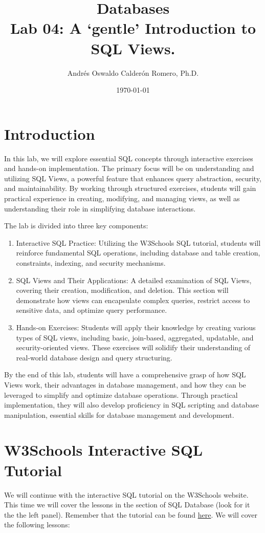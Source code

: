 \documentclass{article}
\title{Databases \\ Lab 04: A `gentle' Introduction to SQL Views.}
\author{Andrés Oswaldo Calderón Romero, Ph.D.}
\date{\today}
\begin{document}
\maketitle

\section{Introduction}
In this lab, we will explore essential SQL concepts through interactive exercises and hands-on implementation. The primary focus will be on understanding and utilizing SQL Views, a powerful feature that enhances query abstraction, security, and maintainability. By working through structured exercises, students will gain practical experience in creating, modifying, and managing views, as well as understanding their role in simplifying database interactions.

The lab is divided into three key components:

\begin{enumerate}
  \item Interactive SQL Practice: Utilizing the W3Schools SQL tutorial, students will reinforce fundamental SQL operations, including database and table creation, constraints, indexing, and security mechanisms.
  \item SQL Views and Their Applications: A detailed examination of SQL Views, covering their creation, modification, and deletion. This section will demonstrate how views can encapsulate complex queries, restrict access to sensitive data, and optimize query performance.
  \item Hands-on Exercises: Students will apply their knowledge by creating various types of SQL views, including basic, join-based, aggregated, updatable, and security-oriented views. These exercises will solidify their understanding of real-world database design and query structuring.

\end{enumerate}

By the end of this lab, students will have a comprehensive grasp of how SQL Views work, their advantages in database management, and how they can be leveraged to simplify and optimize database operations. Through practical implementation, they will also develop proficiency in SQL scripting and database manipulation, essential skills for database management and development.

\section{W3Schools Interactive SQL Tutorial} \label{sec:w3s}
We will continue with the interactive SQL tutorial on the W3Schools website.  This time we will cover the lessons in the section of SQL Database (look for it the the left panel). Remember that the tutorial can be found \href{https://www.w3schools.com/sql/}{here}. We will cover the following lessons:
\end{document}
